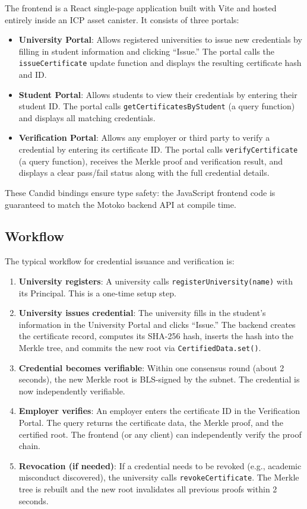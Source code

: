 \documentclass[conference]{IEEEtran}
\begin{document}
The frontend is a React single-page application built with Vite and hosted entirely inside an ICP asset canister. It consists of three portals:

\begin{itemize}[leftmargin=*]
  \item \textbf{University Portal}: Allows registered universities to issue new credentials by filling in student information and clicking ``Issue.'' The portal calls the \texttt{issueCertificate} update function and displays the resulting certificate hash and ID.
  \item \textbf{Student Portal}: Allows students to view their credentials by entering their student ID. The portal calls \texttt{getCertificatesByStudent} (a query function) and displays all matching credentials.
  \item \textbf{Verification Portal}: Allows any employer or third party to verify a credential by entering its certificate ID. The portal calls \texttt{verifyCertificate} (a query function), receives the Merkle proof and verification result, and displays a clear pass/fail status along with the full credential details.
\end{itemize}

These Candid bindings ensure type safety: the JavaScript frontend code is guaranteed to match the Motoko backend API at compile time.

\subsection{Workflow}

The typical workflow for credential issuance and verification is:

\begin{enumerate}
  \item \textbf{University registers}: A university calls \texttt{registerUniversity(name)} with its Principal. This is a one-time setup step.
  \item \textbf{University issues credential}: The university fills in the student's information in the University Portal and clicks ``Issue.'' The backend creates the certificate record, computes its SHA-256 hash, inserts the hash into the Merkle tree, and commits the new root via \texttt{CertifiedData.set()}.
  \item \textbf{Credential becomes verifiable}: Within one consensus round (about 2 seconds), the new Merkle root is BLS-signed by the subnet. The credential is now independently verifiable.
  \item \textbf{Employer verifies}: An employer enters the certificate ID in the Verification Portal. The query returns the certificate data, the Merkle proof, and the certified root. The frontend (or any client) can independently verify the proof chain.
  \item \textbf{Revocation (if needed)}: If a credential needs to be revoked (e.g., academic misconduct discovered), the university calls \texttt{revokeCertificate}. The Merkle tree is rebuilt and the new root invalidates all previous proofs within 2 seconds.
\end{enumerate}
\end{document}
